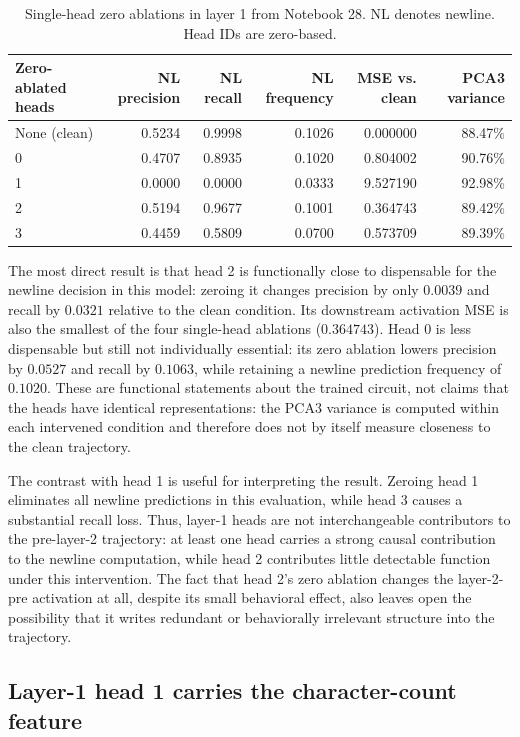 \documentclass[11pt]{article}
\begin{document}
\begin{table}[t]
\centering
\small
\begin{tabular}{lrrrrr}
\toprule
Zero-ablated heads & NL precision & NL recall & NL frequency & MSE vs. clean & PCA3 variance \\
\midrule
None (clean) & 0.5234 & 0.9998 & 0.1026 & 0.000000 & 88.47\% \\
0 & 0.4707 & 0.8935 & 0.1020 & 0.804002 & 90.76\% \\
1 & 0.0000 & 0.0000 & 0.0333 & 9.527190 & 92.98\% \\
2 & 0.5194 & 0.9677 & 0.1001 & 0.364743 & 89.42\% \\
3 & 0.4459 & 0.5809 & 0.0700 & 0.573709 & 89.39\% \\
\bottomrule
\end{tabular}
\caption{Single-head zero ablations in layer 1 from Notebook 28. NL denotes
newline. Head IDs are zero-based.}
\label{tab:layer1-zero-ablation}
\end{table}

The most direct result is that head 2 is functionally close to dispensable for
the newline decision in this model: zeroing it changes precision by only
$0.0039$ and recall by $0.0321$ relative to the clean condition.  Its
downstream activation MSE is also the smallest of the four single-head
ablations ($0.364743$).  Head 0 is less dispensable but still not individually
essential: its zero ablation lowers precision by $0.0527$ and recall by
$0.1063$, while retaining a newline prediction frequency of $0.1020$.
These are functional statements about the trained circuit, not claims that
the heads have identical representations: the PCA3 variance is computed
within each intervened condition and therefore does not by itself measure
closeness to the clean trajectory.

The contrast with head 1 is useful for interpreting the result.  Zeroing head
1 eliminates all newline predictions in this evaluation, while head 3 causes
a substantial recall loss.  Thus, layer-1 heads are not interchangeable
contributors to the pre-layer-2 trajectory: at least one head carries a strong
causal contribution to the newline computation, while head 2 contributes
little detectable function under this intervention.  The fact that head 2's
zero ablation changes the layer-2-pre activation at all, despite its small
behavioral effect, also leaves open the possibility that it writes redundant
or behaviorally irrelevant structure into the trajectory.

\subsection{Layer-1 head 1 carries the character-count feature}
\end{document}
